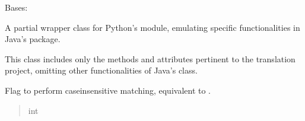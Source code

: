 \documentclass[letterpaper,10pt,english]{sphinxmanual}
\begin{document}
\begin{fulllineitems}
\label{\detokenize{apache_commons_validator_python.util:apache_commons_validator_python.util.regex.Regex}}
\pysigstartsignatures
{}
\pysigstopsignatures
\sphinxAtStartPar
Bases: 

\sphinxAtStartPar
A partial wrapper class for Python’s  module, emulating specific
functionalities in Java’s  package.

\sphinxAtStartPar
This class includes only the methods and attributes pertinent to the translation project,
omitting other functionalities of Java’s  class.

\begin{fulllineitems}
\label{\detokenize{apache_commons_validator_python.util:apache_commons_validator_python.util.regex.Regex.CASE_INSENSITIVE}}
\pysigstartsignatures
{}
\pysigstopsignatures
\sphinxAtStartPar
Flag to perform case\sphinxhyphen{}insensitive matching, equivalent to .
\begin{quote}\begin{description}
\sphinxAtStartPar
int

\end{description}\end{quote}

\end{fulllineitems}


\begin{fulllineitems}
\label{\detokenize{apache_commons_validator_python.util:id0}}
\pysigstartsignatures
{}
\pysigstopsignatures
\end{fulllineitems}


\end{fulllineitems}
\end{document}
